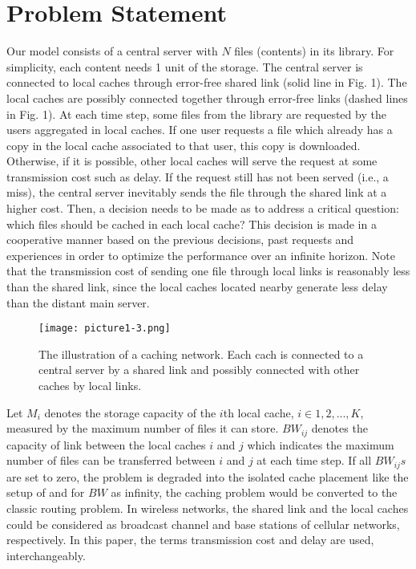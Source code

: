 \documentclass[journal,onecolumn]{IEEEtran}
\begin{document}
\section{Problem Statement}
\label{problem-statement}

Our model consists of a central server with $N$ files (contents) in its library. For simplicity, each content needs 1 unit of the storage. The central server is connected to local caches through error-free shared link (solid line in Fig. 1). The local caches are possibly connected together through error-free links (dashed lines in Fig. 1). 
At each time step, some files from the library are requested by the users aggregated in local caches. If one user requests a file which already has a copy in the local cache associated to that user, this copy is downloaded. Otherwise, if it is possible, other local caches will serve the request at some transmission cost such as delay. If the request still has not been served (i.e., a miss), the central server inevitably sends the file through the shared link at a higher cost. Then, a decision needs to be made as to address a critical question: which files should be cached in each local cache? This decision is made in a cooperative manner based on the previous decisions, past requests and experiences in order to optimize the performance over an infinite horizon. Note that the transmission cost of sending one file through local links is reasonably less than the shared link, since the local caches located nearby generate less delay than the distant main server. 

\begin{figure}[h]
\centering
\texttt{[image: picture1-3.png]}
\caption{The illustration of a caching network. Each cach is connected to a central server by a shared link and possibly connected with other caches by local links.}\label{fig:pic1}
\end{figure}

Let $M_i$ denotes the storage capacity of the $i$th local cache, $i\in {1,2,...,K}$, measured by the maximum number of files it can store.  $BW_{ij}$ denotes the capacity of link between the local caches $i$ and $j$ which indicates the maximum number of files can be transferred between $i$ and $j$ at each time step. If all $BW_{ij}s$ are set to zero, the problem is degraded into the isolated cache placement like the setup of \cite{blasco2014learning} and for $BW$ as infinity, the caching problem would be converted to the classic routing problem.
In wireless networks, the shared link and the local caches could be considered as broadcast channel and base stations of cellular networks, respectively. In this paper, the terms transmission cost and delay are used, interchangeably.
\end{document}
